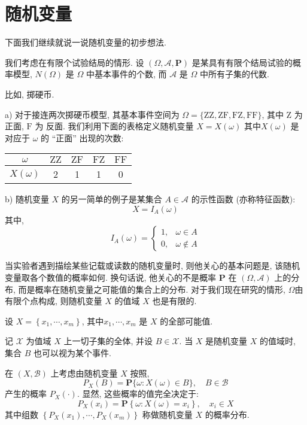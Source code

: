 \section{随机变量}
下面我们继续就说一说随机变量的初步想法. 

我们考虑在有限个试验结局的情形. 设 $(\Omega, \mathscr{A}, \mathbf{P})$ 是某具有有限个结局试验的概率模型, $N(\Omega)$ 是 $\Omega$ 中基本事件的个数, 而 $\mathscr{A}$ 是 $\Omega$ 中所有子集的代数. 

比如, 掷硬币. 

\begin{example}
    a) 对于接连两次掷硬币模型, 其基本事件空间为 $\Omega=\{\mathrm{ZZ}, \mathrm{ZF}, \mathrm{FZ}, \mathrm{FF}\}$, 其中 $\mathrm{Z}$ 为 正面, $\mathrm{F}$ 为 反面. 我们利用下面的表格定义随机变量 $X=X(\omega)$ 其中$X(\omega)$ 是对应于 $\omega$ 的 “正面” 出现的次数:
    \begin{tabular}{c|c|c|c|c}
        \hline$\omega$ & $\mathrm{ZZ}$ & $\mathrm{ZF}$ & $\mathrm{FZ}$ & $\mathrm{FF}$ \\
        \hline$X(\omega)$ & 2 & 1 & 1 & 0 \\
        \hline
        \end{tabular}

        b) 随机变量 $X$ 的另一简单的例子是某集合 $A \in \mathscr{A}$ 的示性函数 (亦称特征函数):
        $$
        X=I_A(\omega)
        $$其中, $$
        I_A(\omega)= \begin{cases}1, & \omega \in A \\ 0, & \omega \notin A\end{cases}
        $$
\end{example}

当实验者遇到描绘某些记载或读数的随机变量时, 则他关心的基本问题是, 该随机
变量取各个数值的概率如何. 换句话说, 他关心的不是概率 $\mathbf{P}$ 在 $(\Omega, \mathscr{A})$ 上的分布, 而是概率在随机变量之可能值的集合上的分布. 对于我们现在研究的情形, $\Omega$由有限个点构成, 则随机变量 $X$ 的值域 $X$ 也是有限的.

设 $X=\left\{x_1, \cdots, x_m\right\}$, 其中$x_1, \cdots, x_m$ 是 $X$ 的全部可能值.

记 $\mathscr{X}$ 为值域 $X$ 上一切子集的全体, 并设 $B \in \mathscr{X}$. 当 $X$ 是随机变量 $X$ 的值域时, 集合 $B$ 也可以视为某个事件.

在 $(X, \mathscr{B})$ 上考虑由随机变量 $X$ 按照,
$$
P_{X}(B)=\mathbf{P}\{\omega: X(\omega) \in B\}, \quad B \in \mathscr{B}
$$
产生的概率 $P_{X}(\cdot)$. 显然, 这些概率的值完全决定于:
$$
P_{X}\left(x_i\right)=\mathbf{P}\left\{\omega: X(\omega)=x_i\right\}, \quad x_i \in X
$$
其中组数 $\left\{P_{X}\left(x_1\right), \cdots, P_{X}\left(x_m\right)\right\}$ 称做随机变量 $X$ 的概率分布.

